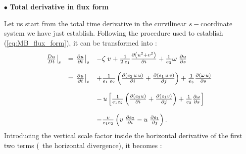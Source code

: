 \documentclass[../main/NEMO_manual]{subfiles}
\begin{document}
$\bullet$ \textbf{Total derivative in flux form}

Let us start from the total time derivative in the curvilinear $s-$coordinate system we have just establish.
Following the procedure used to establish (\autoref{eq:MB_flux_form}), it can be transformed into :
\begin{align*}
  {
  \begin{array}{*{20}l}
    \left. \frac{D u}{D t} \right|_s  &= \left. {\frac{\partial u }{\partial t}} \right|_s
    & -  \zeta \;v
      + \frac{1}{2\;e_1 } \frac{\partial \left( {u^2+v^2} \right)}{\partial i}
      + \frac{1}{e_3} \omega \;\frac{\partial u}{\partial s} \\ \\
                                      &= \left. {\frac{\partial u }{\partial t}} \right|_s
    &+\frac{1}{e_1\;e_2}  \left(    \frac{\partial \left( {e_2 \,u\,u } \right)}{\partial i}
      + \frac{\partial \left( {e_1 \,u\,v } \right)}{\partial j}     \right)
      + \frac{1}{e_3 } \frac{\partial \left( {\omega\,u} \right)}{\partial s} \\ \\
                                      &&- \,u \left[     \frac{1}{e_1 e_2 } \left(    \frac{\partial(e_2 u)}{\partial i}
                                         + \frac{\partial(e_1 v)}{\partial j}    \right)
                                         + \frac{1}{e_3}        \frac{\partial \omega}{\partial s}                       \right] \\ \\
                                      &&- \frac{v}{e_1 e_2 }\left(    v	\;\frac{\partial e_2 }{\partial i}
                                         -u	\;\frac{\partial e_1 }{\partial j} 	\right) . \\
  \end{array}
  }
\end{align*}
Introducing the vertical scale factor inside the horizontal derivative of the first two terms
(\ie\ the horizontal divergence), it becomes :
\end{document}
